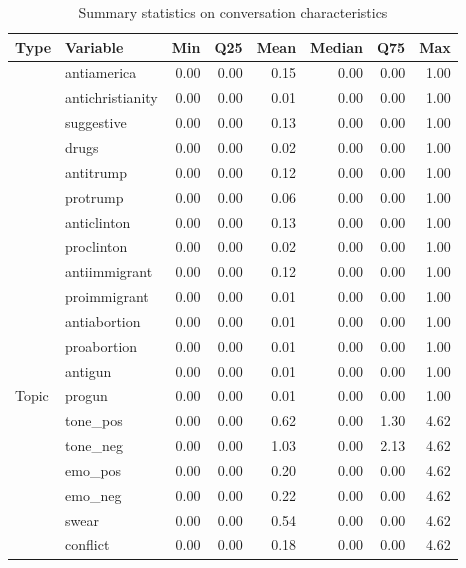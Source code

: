 \begin{table}[!h]
\centering
\caption{\label{tab:summ-tab2}Summary statistics on conversation characteristics}
\centering
\begin{tabular}[t]{llrrrrrr}
\toprule
Type & Variable & Min & Q25 & Mean & Median & Q75 & Max\\
\midrule
 & antiamerica & 0.00 & 0.00 & 0.15 & 0.00 & 0.00 & 1.00\\
\cmidrule{2-8}
 & antichristianity & 0.00 & 0.00 & 0.01 & 0.00 & 0.00 & 1.00\\
\cmidrule{2-8}
 & suggestive & 0.00 & 0.00 & 0.13 & 0.00 & 0.00 & 1.00\\
\cmidrule{2-8}
 & drugs & 0.00 & 0.00 & 0.02 & 0.00 & 0.00 & 1.00\\
\cmidrule{2-8}
 & antitrump & 0.00 & 0.00 & 0.12 & 0.00 & 0.00 & 1.00\\
\cmidrule{2-8}
 & protrump & 0.00 & 0.00 & 0.06 & 0.00 & 0.00 & 1.00\\
\cmidrule{2-8}
 & anticlinton & 0.00 & 0.00 & 0.13 & 0.00 & 0.00 & 1.00\\
\cmidrule{2-8}
 & proclinton & 0.00 & 0.00 & 0.02 & 0.00 & 0.00 & 1.00\\
\cmidrule{2-8}
 & antiimmigrant & 0.00 & 0.00 & 0.12 & 0.00 & 0.00 & 1.00\\
\cmidrule{2-8}
 & proimmigrant & 0.00 & 0.00 & 0.01 & 0.00 & 0.00 & 1.00\\
\cmidrule{2-8}
 & antiabortion & 0.00 & 0.00 & 0.01 & 0.00 & 0.00 & 1.00\\
\cmidrule{2-8}
 & proabortion & 0.00 & 0.00 & 0.01 & 0.00 & 0.00 & 1.00\\
\cmidrule{2-8}
 & antigun & 0.00 & 0.00 & 0.01 & 0.00 & 0.00 & 1.00\\
\cmidrule{2-8}
\multirow{-14}{*}{\raggedright\arraybackslash Topic} & progun & 0.00 & 0.00 & 0.01 & 0.00 & 0.00 & 1.00\\
\cmidrule{1-8}
 & tone\_pos & 0.00 & 0.00 & 0.62 & 0.00 & 1.30 & 4.62\\
\cmidrule{2-8}
 & tone\_neg & 0.00 & 0.00 & 1.03 & 0.00 & 2.13 & 4.62\\
\cmidrule{2-8}
 & emo\_pos & 0.00 & 0.00 & 0.20 & 0.00 & 0.00 & 4.62\\
\cmidrule{2-8}
 & emo\_neg & 0.00 & 0.00 & 0.22 & 0.00 & 0.00 & 4.62\\
\cmidrule{2-8}
 & swear & 0.00 & 0.00 & 0.54 & 0.00 & 0.00 & 4.62\\
\cmidrule{2-8}
 & conflict & 0.00 & 0.00 & 0.18 & 0.00 & 0.00 & 4.62\\

\end{tabular}
\end{table}
